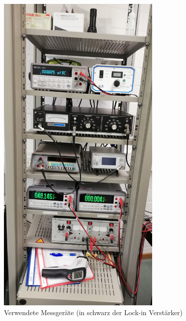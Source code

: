 \begin{figure}[h]
    \centering
    \includegraphics[width = 8cm]{Bilder/Aufbau3.jpg}
    \caption{Verwendete Messgeräte (in schwarz der Lock-in Verstärker)}
\end{figure}

